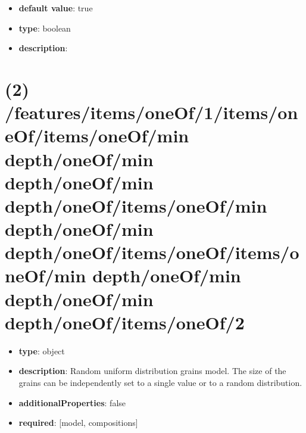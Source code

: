 \begin{itemize}[leftmargin=4em]\item {\bf default value}: true
\item {\bf type}: boolean
\item {\bf description}: 
\end{itemize}\section{(2) /features/items/oneOf/1/items/oneOf/items/oneOf/min depth/oneOf/min depth/oneOf/min depth/oneOf/items/oneOf/min depth/oneOf/min depth/oneOf/items/oneOf/items/oneOf/min depth/oneOf/min depth/oneOf/min depth/oneOf/items/oneOf/2}
\begin{itemize}[leftmargin=2em]\item {\bf type}: object
\item {\bf description}: Random uniform distribution grains model. The size of the grains can be independently set to a single value or to a random distribution.
\item {\bf additionalProperties}: false
\item {\bf required}: [model, compositions]\end{itemize}
